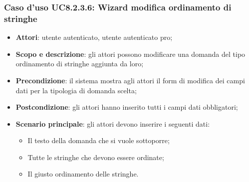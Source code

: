 \subsubsection{Caso d’uso UC8.2.3.6: Wizard modifica ordinamento di stringhe}
\begin{itemize}
	\item\textbf{Attori}: utente autenticato, utente autenticato pro;
	\item\textbf{Scopo e descrizione}: gli attori possono modificare una domanda del tipo ordinamento di stringhe aggiunta da loro;
	\item\textbf{Precondizione}: il sistema mostra agli attori il form di modifica dei campi dati per la tipologia di domanda scelta; 
	\item \textbf{Postcondizione}: gli attori hanno inserito tutti i campi dati obbligatori;
	\item\textbf{Scenario principale}: gli attori devono inserire i seguenti dati:
	\begin{itemize}
		\item Il testo della domanda che si vuole sottoporre;
		\item Tutte le stringhe che devono essere ordinate;
		\item Il giusto ordinamento delle stringhe.
	\end{itemize}
\end{itemize}